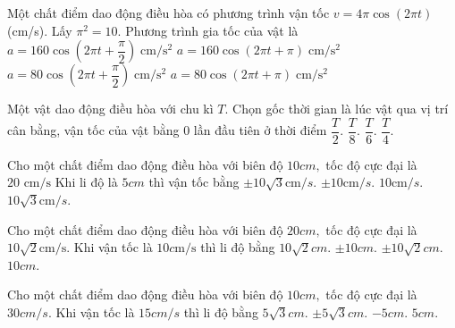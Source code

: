 \begin{ex}
	Một chất điểm dao động điều hòa có phương trình vận tốc $v=4\pi\cos(2\pi t)$ (cm/s). Lấy $\pi^2=10$. Phương trình gia tốc của vật là
	\choice
	{$a=160\cos\left(2\pi t+\dfrac{\pi}{2}\right)\;\mathrm{cm/s^2}$}
	{$a=160\cos(2\pi t+\pi)\;\mathrm{cm/s^2}$}
	{\True $a=80\cos\left(2\pi t+\dfrac{\pi}{2}\right)\;\mathrm{cm/s^2}$}
	{$a=80\cos(2\pi t+\pi)\;\mathrm{cm/s^2}$}
\end{ex}

\begin{ex}
	Một vật dao động điều hòa với chu kì $T.$ Chọn gốc thời gian là lúc vật qua vị trí cân bằng, vận tốc của vật bằng 0 lần đầu tiên ở thời điểm
	\choice
	{$\dfrac{T}{2}.$}
	{$\dfrac{T}{8}.$}
	{$\dfrac{T}{6}.$}
	{\True $\dfrac{T}{4}.$}
\end{ex}

\begin{ex}
	Cho một chất điểm dao động điều hòa với biên độ $10cm,$ tốc độ cực đại là $\text{20 cm/s}\text{}$ Khi li độ là $5cm$ thì vận tốc bằng
	\choice
	{\True $\pm 10\sqrt{3}\text{cm/}s.$}
	{$\pm 10\text{cm/}s.$}
	{$10\text{cm/}s.$}
	{$10\sqrt{3}\text{cm/}s.$}
\end{ex}

\begin{ex}
	Cho một chất điểm dao động điều hòa với biên độ $20cm,$ tốc độ cực đại là $10\sqrt{2}\text{cm/s}\text{}$. Khi vận tốc là $10c\text{m/s}$ thì li độ bằng
	\choice
	{$10\sqrt{2}cm.$}
	{$\pm 10cm.$}
	{\True $\pm 10\sqrt{2}cm.$}
	{$10cm.$}
\end{ex}

\begin{ex}
	Cho một chất điểm dao động điều hòa với biên độ $10cm,$ tốc độ cực đại là $30cm\text{/}s.$ Khi vận tốc là $15cm\text{/}s$ thì li độ bằng
	\choice
	{$5\sqrt{3}cm.$}
	{\True $\pm 5\sqrt{3}cm.$}
	{$-5cm.$}
	{$5cm.$}
\end{ex}

